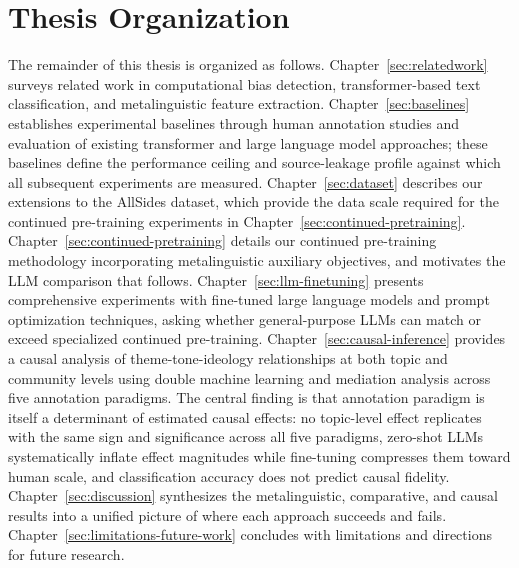 \section{Thesis Organization}

The remainder of this thesis is organized as follows. Chapter~\ref{sec:relatedwork} surveys related work in computational bias detection, transformer-based text classification, and metalinguistic feature extraction. Chapter~\ref{sec:baselines} establishes experimental baselines through human annotation studies and evaluation of existing transformer and large language model approaches; these baselines define the performance ceiling and source-leakage profile against which all subsequent experiments are measured. Chapter~\ref{sec:dataset} describes our extensions to the AllSides dataset, which provide the data scale required for the continued pre-training experiments in Chapter~\ref{sec:continued-pretraining}. Chapter~\ref{sec:continued-pretraining} details our continued pre-training methodology incorporating metalinguistic auxiliary objectives, and motivates the LLM comparison that follows. Chapter~\ref{sec:llm-finetuning} presents comprehensive experiments with fine-tuned large language models and prompt optimization techniques, asking whether general-purpose LLMs can match or exceed specialized continued pre-training. Chapter~\ref{sec:causal-inference} provides a causal analysis of theme-tone-ideology relationships at both topic and community levels using double machine learning and mediation analysis across five annotation paradigms. The central finding is that annotation paradigm is itself a determinant of estimated causal effects: no topic-level effect replicates with the same sign and significance across all five paradigms, zero-shot LLMs systematically inflate effect magnitudes while fine-tuning compresses them toward human scale, and classification accuracy does not predict causal fidelity. Chapter~\ref{sec:discussion} synthesizes the metalinguistic, comparative, and causal results into a unified picture of where each approach succeeds and fails. Chapter~\ref{sec:limitations-future-work} concludes with limitations and directions for future research.
